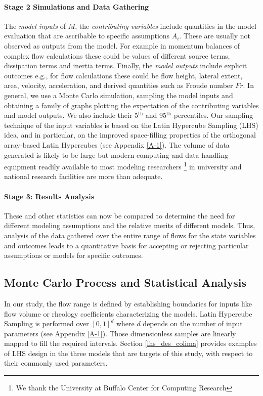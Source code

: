 \documentclass{article}
\begin{document}
\paragraph{Stage 2 Simulations and Data Gathering}
The \emph{model inputs}  of $M$, the \emph{contributing variables} include quantities in the model evaluation that are ascribable to specific assumptions $A_i$. These are usually not observed as outputs from the model. For example in momentum balances of complex flow calculations these could be values of different source terms, dissipation terms and inertia terms. Finally, the \emph{model outputs} include explicit outcomes e.g., for flow calculations these could be flow height, lateral extent, area, velocity, acceleration, and derived quantities such as Froude number $Fr$. In general, we use a Monte Carlo simulation, sampling the model inputs and obtaining a family of graphs plotting the expectation of the contributing variables and model outputs. We also include their 5$^{\mathrm{th}}$ and 95$^{\mathrm{th}}$ percentiles. Our sampling technique of the input variables is based on the Latin Hypercube Sampling (LHS) idea, and in particular, on the improved space-filling properties of the orthogonal array-based Latin Hypercubes (see Appendix \ref{A-1}). The volume of data generated is likely to be large but modern computing and data handling equipment readily available to most modeling researchers \footnote{We thank the University at Buffalo Center for Computing Research} in university and national research facilities are more than adequate.

\paragraph{Stage 3: Results Analysis} These and other statistics can now be compared to determine the need for different modeling assumptions and the relative merits of different models. Thus, analysis of the data gathered over the entire range of flows for the state variables and outcomes leads to a quantitative basis for accepting or rejecting particular assumptions or models for specific outcomes.


\subsection{Monte Carlo Process and Statistical Analysis}
In our study, the flow range is defined by establishing boundaries for inputs like flow volume or rheology coefficients characterizing the models.  Latin Hypercube Sampling is performed over $[0,1]^d$ where $d$ depends on the number of  input parameters (see Appendix \ref{A-1}). Those dimensionless samples are linearly  mapped to fill the required intervals. Section \ref{lhs_des_colima} provides examples of LHS design in the three models that are targets of this study, with respect to their commonly used parameters.
\end{document}
